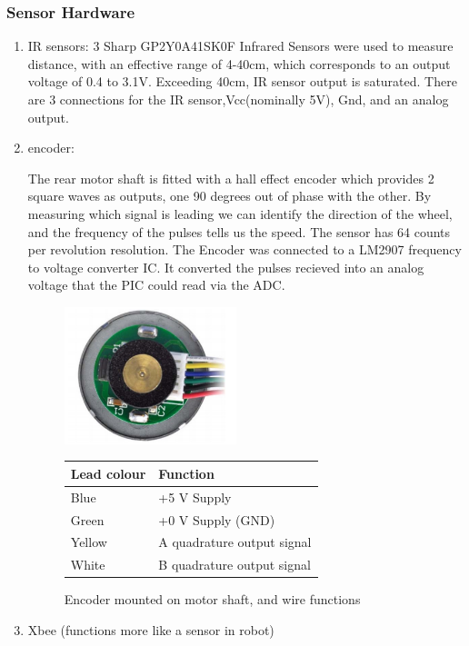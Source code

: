 \documentclass[11pt,a4paper]{article}
\begin{document}
    \subsubsection{Sensor Hardware}
      \begin{enumerate}
        \item IR sensors:{ 3 Sharp GP2Y0A41SK0F Infrared Sensors were used to measure distance, with an effective range of 4-40cm, which corresponds to an output voltage of 0.4 to 3.1V. Exceeding 40cm, IR sensor output is saturated. There are 3 connections for the IR sensor,Vcc(nominally 5V), Gnd, and an analog output.}
        \item encoder:{ The rear motor shaft is fitted with a hall effect encoder which provides 2 square waves as outputs, one 90 degrees out of phase with the other. By measuring which signal is leading we can identify the direction of the wheel, and the frequency of the pulses tells us the speed. The sensor has 64 counts per revolution resolution. The Encoder was connected to a LM2907 frequency to voltage converter IC. It converted the pulses recieved into an analog voltage that the PIC could read via the ADC.
        \begin{figure}
          \centering
          \begin{minipage}{0.45\textwidth}
              \centering
              \includegraphics[width = 5cm]{encoder.png}
          \end{minipage}\hfill
          \begin{minipage}{0.45\textwidth}
              \centering
              \begin{tabular}[b]{|l|l|}
                \hline \textbf{Lead colour} & \textbf{Function}\\
                \hline Blue   & +5 V Supply\\
                \hline Green  & +0 V Supply (GND)\\
                \hline Yellow & A quadrature output signal\\
                \hline White  & B quadrature output signal\\
                \hline
              \end{tabular}
          \end{minipage}
          \caption{Encoder mounted on motor shaft, and wire functions}
        \end{figure}
        }
        \item Xbee (functions more like a sensor in robot)
      \end{enumerate}
\end{document}
